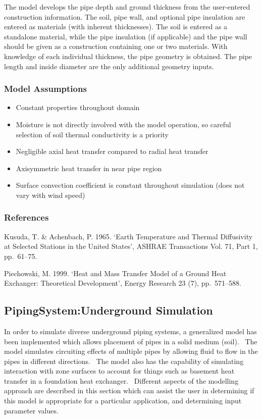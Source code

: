 The model develops the pipe depth and ground thickness from the user-entered construction information. The soil, pipe wall, and optional pipe insulation are entered as materials (with inherent thicknesses). The soil is entered as a standalone material, while the pipe insulation (if applicable) and the pipe wall should be given as a construction containing one or two materials. With knowledge of each individual thickness, the pipe geometry is obtained. The pipe length and inside diameter are the only additional geometry inputs.

\subsubsection{Model Assumptions}\label{model-assumptions-000}

\begin{itemize}
\item
  Constant properties throughout domain
\item
  Moisture is not directly involved with the model operation, so careful selection of soil thermal conductivity is a priority
\item
  Negligible axial heat transfer compared to radial heat transfer
\item
  Axisymmetric heat transfer in near pipe region
\item
  Surface convection coefficient is constant throughout simulation (does not vary with wind speed)
\end{itemize}

\subsubsection{References}\label{references-1-015}

Kusuda, T. \& Achenbach, P. 1965. `Earth Temperature and Thermal Diffusivity at Selected Stations in the United States', ASHRAE Transactions Vol. 71, Part 1, pp.~61--75.

Piechowski, M. 1999. `Heat and Mass Transfer Model of a Ground Heat Exchanger: Theoretical Development', Energy Research 23 (7), pp.~571--588.

\subsection{PipingSystem:Underground Simulation}\label{pipingsystemunderground-simulation}

In order to simulate diverse underground piping systems, a generalized model has been implemented which allows placement of pipes in a solid medium (soil).~ The model simulates circuiting effects of multiple pipes by allowing fluid to flow in the pipes in different directions.~ The model also has the capability of simulating interaction with zone surfaces to account for things such as basement heat transfer in a foundation heat exchanger.~ Different aspects of the modelling approach are described in this section which can assist the user in determining if this model is appropriate for a particular application, and determining input parameter values.

